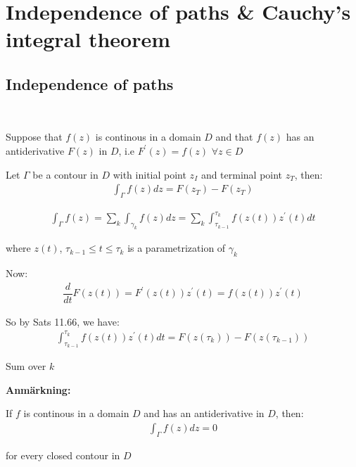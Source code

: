 \section{Independence of paths \& Cauchy's integral theorem}
\par\bigskip
\subsection{Independence of paths}\hfill\\
\par\bigskip
\begin{theo}[]{}
  Suppose that $f(z)$ is continous in a domain $D$ and that $f(z)$ has an antiderivative $F(z)$ in $D$, i.e $F^{\prime}(z) = f(z)$ $\forall z\in D$
  \par\bigskip
  \noindent Let $\Gamma $ be a contour in $D$ with initial point $z_I$ and terminal point $z_T$, then:
  \begin{equation*}
    \begin{gathered}
      \int_{\Gamma}f(z)dz = F(z_T)-F(z_T)
    \end{gathered}
  \end{equation*}
\end{theo}
\par\bigskip
\begin{prf}[]{}
  \begin{equation*}
    \begin{gathered}
      \int_{\Gamma}f(z) = \sum_{k}\int_{\gamma_k}f(z)dz = \sum_{k}\int_{\tau_{k-1}}^{\tau_k}f(z(t))z^{\prime}(t)dt
    \end{gathered}
  \end{equation*}\par
  \noindent where $z(t)$, $\tau_{k-1}\leq t\leq\tau_k$ is a parametrization of $\gamma_k$
  \par\bigskip
  \noindent Now:
  \begin{equation*}
    \begin{gathered}
      \dfrac{d}{dt}F(z(t)) = F^{\prime}(z(t))z^{\prime}(t) = f(z(t))z^{\prime}(t)
    \end{gathered}
  \end{equation*}\par
  \noindent So by Sats 11.66, we have:
  \begin{equation*}
    \begin{gathered}
      \int_{\tau_{k-1}}^{\tau_k}f(z(t))z^{\prime}(t)dt = F(z(\tau_k))-F(z(\tau_{k-1}))
    \end{gathered}
  \end{equation*}\par
  \noindent Sum over $k$
\end{prf}
\par\bigskip
\noindent\textbf{Anmärkning:}\par
\noindent If $f$ is continous in a domain $D$ and has an antiderivative in $D$, then:
\begin{equation*}
  \begin{gathered}
    \int_{\Gamma}f(z)dz = 0
  \end{gathered}
\end{equation*}\par
\noindent for every closed contour in $D$
